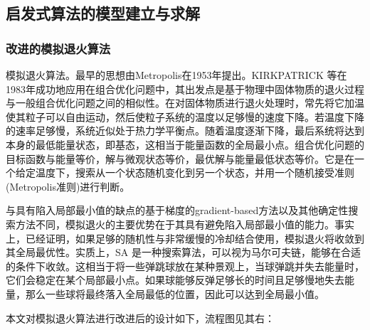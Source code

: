 \documentclass[withoutpreface,bwprint]{cumcmthesis} %
\begin{document}
\subsection{启发式算法的模型建立与求解}
\subsubsection{改进的模拟退火算法}
模拟退火算法。最早的思想由Metropolis在1953年提出。KIRKPATRICK 等在1983年成功地应用在组合优化问题中，其出发点是基于物理中固体物质的退火过程与一般组合优化问题之间的相似性。在对固体物质进行退火处理时，常先将它加温使其粒子可以自由运动，然后使粒子系统的温度以足够慢的速度下降。若温度下降的速率足够慢，系统近似处于热力学平衡点。随着温度逐渐下降，最后系统将达到本身的最低能量状态，即基态，这相当于能量函数的全局最小点。组合优化问题的目标函数与能量等价，解与微观状态等价，最优解与能量最低状态等价。它是在一个给定温度下，搜索从一个状态随机变化到另一个状态，并用一个随机接受准则(Metropolis准则)进行判断。\par
与具有陷入局部最小值的缺点的基于梯度的gradient-based方法以及其他确定性搜索方法不同，模拟退火的主要优势在于其具有避免陷入局部最小值的能力。事实上，已经证明，如果足够的随机性与非常缓慢的冷却结合使用，模拟退火将收敛到其全局最优性。实质上，SA 是一种搜索算法，可以视为马尔可夫链，能够在合适的条件下收敛。这相当于将一些弹跳球放在某种景观上，当球弹跳并失去能量时，它们会稳定在某个局部最小点。如果球能够反弹足够长的时间且足够慢地失去能量，那么一些球将最终落入全局最低的位置，因此可以达到全局最小值。\par
本文对模拟退火算法进行改进后的设计如下，流程图见其右：\\
\end{document}
